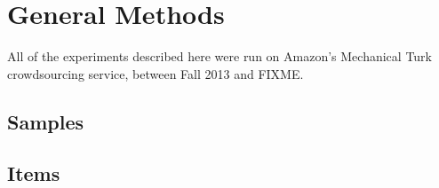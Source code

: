 \section{General Methods}

All of the experiments described here were run on Amazon's Mechanical Turk crowdsourcing service, between Fall 2013 and FIXME. 

\subsection{Samples}

\subsection{Items}



 